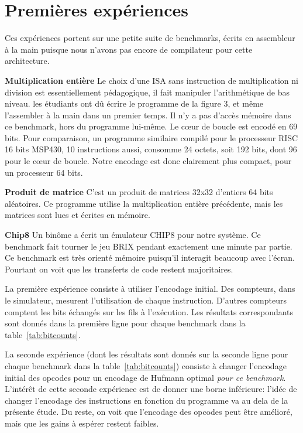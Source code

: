 \documentclass[architecture]{compas2018}
\newcommand{\todo}[1]{\textcolor{red}{TODO: #1}}
\begin{document}
\fi

\section{Premières expériences}
Ces expériences portent sur une petite suite de benchmarks, écrits en assembleur à la main puisque nous n'avons pas encore de compilateur pour cette architecture.

\textbf{Multiplication entière} Le choix d'une ISA sans instruction de multiplication ni division est essentiellement pédagogique, il fait manipuler l'arithmétique de bas niveau.
les étudiants ont dû écrire le programme de la figure 3, et même l'assembler à la main dans un premier temps. Il n'y a pas d'accès mémoire dans ce benchmark, hors du programme lui-même. Le c\oe ur de boucle est encodé en 69 bits.
Pour comparaison, un programme similaire compilé pour le processeur RISC 16 bits MSP430, 10 instructions aussi, consomme  24 octets, soit 192 bits, dont 96 pour le c\oe ur de boucle.
Notre encodage est donc clairement plus compact, pour un processeur 64 bits.




\textbf{Produit de matrice}
C'est un produit de matrices 32x32 d'entiers 64 bits aléatoires.
Ce programme utilise la multiplication entière précédente, mais les matrices sont lues et écrites en mémoire.

\textbf{Chip8}
Un binôme a écrit un émulateur CHIP8 \cite{Chip8:1978} pour notre système.
Ce benchmark fait tourner le jeu BRIX pendant exactement une minute par partie.
Ce benchmark est très orienté mémoire puisqu'il interagit beaucoup avec l'écran.
Pourtant on voit que les transferts de code restent majoritaires.


La première expérience consiste à utiliser l'encodage initial.
Des compteurs, dans le simulateur, mesurent l'utilisation de chaque instruction.%
D'autres compteurs comptent les bits échangés sur les fils à l'exécution.
Les résultats correspondants sont donnés dans la première  ligne pour chaque benchmark dans la table~\ref{tab:bitcounts}.

La seconde expérience (dont les résultats sont donnés sur la seconde ligne pour chaque benchmark dans la table~\ref{tab:bitcounts}) consiste à changer l'encodage initial des opcodes pour un encodage de Hufmann optimal \emph{pour ce benchmark}.
L'intérêt de cette seconde expérience est de donner une borne inférieure: l'idée de changer l'encodage des instructions en fonction du programme va au dela de la présente étude.
Du reste, on voit que l'encodage des opcodes peut être amélioré, mais que les gains à espérer restent faibles.
\end{document}
